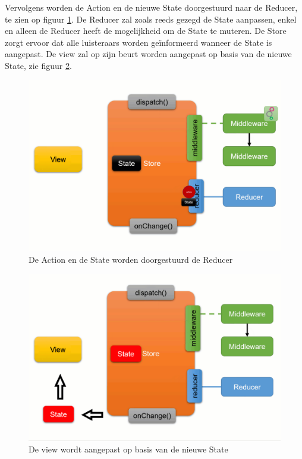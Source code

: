 Vervolgens worden de Action en de nieuwe State doorgestuurd naar de Reducer, te zien op figuur \ref{fig:redux-working-detailed-3}. De Reducer zal zoals reeds gezegd de State aanpassen, enkel en alleen de Reducer heeft de mogelijkheid om de State te muteren. 
De Store zorgt ervoor dat alle luisteraars worden geïnformeerd wanneer de State is aangepast. De view zal op zijn beurt worden aangepast op basis van de nieuwe State, zie figuur \ref{fig:redux-working-detailed-4}.

\begin{figure}[H]
    \centering
    \includegraphics[width=\figureWidthModifier\linewidth]{img/stand-van-zaken/redux-working-detailed-3.png}
    \caption{De Action en de State worden doorgestuurd de Reducer \autocite{Boelens2019}}
    \label{fig:redux-working-detailed-3}
\end{figure}

\begin{figure}[H]
    \centering
    \includegraphics[width=\figureWidthModifier\linewidth]{img/stand-van-zaken/redux-working-detailed-4.png}
    \caption{De view wordt aangepast op basis van de nieuwe State \autocite{Boelens2019}}
    \label{fig:redux-working-detailed-4}
\end{figure}

